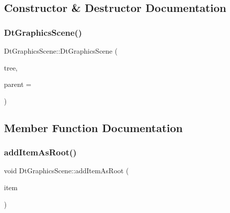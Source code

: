 \subsection{Constructor \& Destructor Documentation}
\mbox{\label{class_dt_graphics_scene_a1d5b3a478ffdac60c0a6c85f50123aa6}} 
\subsubsection{\texorpdfstring{DtGraphicsScene()}{DtGraphicsScene()}}
{\footnotesize\ttfamily Dt\+Graphics\+Scene\+::\+Dt\+Graphics\+Scene (\begin{DoxyParamCaption}\item[{std\+::shared\+\_\+ptr$<$ \mbox{\hyperlink{classdtree_1_1_decision_tree}{dtree\+::\+Decision\+Tree}} $>$}]{tree,  }\item[{Q\+Object $\ast$}]{parent = {} }\end{DoxyParamCaption})\hspace{0.3cm}{\ttfamily [explicit]}}



\subsection{Member Function Documentation}
\mbox{\label{class_dt_graphics_scene_a609f35deb80018bf48f3b8c5d3d19d6b}} 
\subsubsection{\texorpdfstring{addItemAsRoot()}{addItemAsRoot()}}
{\footnotesize\ttfamily void Dt\+Graphics\+Scene\+::add\+Item\+As\+Root (\begin{DoxyParamCaption}\item[{\mbox{\hyperlink{class_graph_node_item}{Graph\+Node\+Item}} $\ast$}]{item }\end{DoxyParamCaption})}

\mbox{\label{class_dt_graphics_scene_a1fa041b4c7acb828f5eb525fd5d26de8}} 
